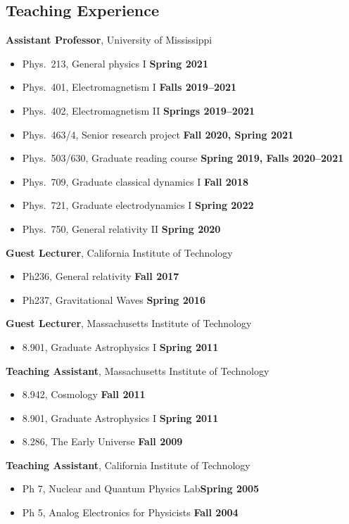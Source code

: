\documentclass[margin,line]{res}
\begin{document}
\begin{resume}
\vspace{-1em}

\section{\sc Teaching Experience}
{\bf Assistant Professor}, University of Mississippi
\vspace*{.05in}
\begin{itemize}
\item[ ] Phys.~213, General physics I \hfill {\bf Spring 2021}
\item[ ] Phys.~401, Electromagnetism I \hfill {\bf Falls 2019--2021}
\item[ ] Phys.~402, Electromagnetism II \hfill {\bf Springs 2019--2021}
\item[ ] Phys.~463/4, Senior research project \hfill {\bf Fall 2020,
    Spring 2021}
\item[ ] Phys.~503/630, Graduate reading course \hfill {\bf Spring 2019, Falls 2020--2021}
\item[ ] Phys.~709, Graduate classical dynamics I \hfill {\bf Fall 2018}
\item[ ] Phys.~721, Graduate electrodynamics I \hfill {\bf Spring 2022}
\item[ ] Phys.~750, General relativity II \hfill {\bf Spring 2020}
\end{itemize}
{\bf Guest Lecturer}, California Institute of Technology
\vspace*{.05in}
\begin{itemize}
\item[ ] Ph236, General relativity \hfill {\bf Fall 2017}
\item[ ] Ph237, Gravitational Waves \hfill {\bf Spring 2016}
\end{itemize}
{\bf Guest Lecturer}, Massachusetts Institute of Technology
\vspace*{.05in}  
\begin{itemize}
\item[ ] 8.901, Graduate Astrophysics I \hfill {\bf Spring 2011}
\end{itemize}
{\bf Teaching Assistant}, Massachusetts Institute of Technology
\vspace*{.05in}
\begin{itemize}
\item[ ] 8.942, Cosmology \hfill {\bf Fall 2011}
\item[ ] 8.901, Graduate Astrophysics I \hfill {\bf Spring 2011}
\item[ ] 8.286, The Early Universe \hfill {\bf Fall 2009}
\end{itemize}
{\bf Teaching Assistant}, California Institute of Technology
\vspace*{.05in}
\begin{itemize}
\item[ ] Ph 7, Nuclear and Quantum Physics Lab\hfill {\bf Spring 2005}
\item[ ] Ph 5, Analog Electronics for Physicists \hfill {\bf Fall 2004}
\end{itemize}


\end{resume}
\end{document}
